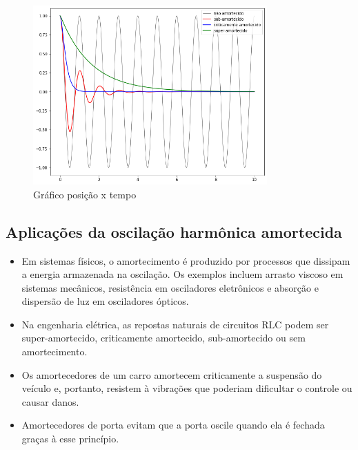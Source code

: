 \begin{figure}[H]
	\centering
	\includegraphics[width=0.8\textwidth]{./Imagens/Oscilador/OH2.png} 
	\caption{Gráfico posição x tempo}
	\label{fig:OH2}
\end{figure}

\subsection{Aplicações da oscilação harmônica amortecida}

\begin{itemize}
\item Em sistemas físicos, o amortecimento é produzido por processos que dissipam a energia armazenada na oscilação. Os exemplos incluem arrasto viscoso em sistemas mecânicos, resistência em osciladores eletrônicos e absorção e dispersão de luz em osciladores ópticos. 
\item Na engenharia elétrica, as repostas naturais de circuitos RLC podem ser super-amortecido, criticamente amortecido, sub-amortecido ou sem amortecimento.
\item Os amortecedores de um carro amortecem criticamente a suspensão do veículo e, portanto, resistem à vibrações que poderiam dificultar o controle ou causar danos. 
\item Amortecedores de porta evitam que a porta oscile quando ela é fechada graças à esse princípio.
\end{itemize}